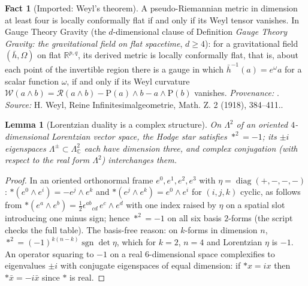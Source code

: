 \documentclass[11pt]{article}
\newtheorem{lemma}[theorem]{Lemma}
\theoremstyle{definition}
\newtheorem{fact}[theorem]{Fact}
\theoremstyle{plain}
\newcommand{\changedmark}[2]{\marginpar{\raggedright\scriptsize\color{#1}#2}}
\providecommand{\C}{}\renewcommand{\C}{\mathbb{C}}
\providecommand{\R}{}\renewcommand{\R}{\mathbb{R}}
\providecommand{\Sch}{}\renewcommand{\Sch}{\mathrm{P}}
\providecommand{\hb}{}\renewcommand{\hb}{\bar{h}}
\begin{document}
\begin{fact}[Imported: Weyl's theorem]\label{c:correspondence.imported-weyls-theorem}
\changedmark{gray}{reworded}
A pseudo-Riemannian metric in dimension at least four is locally conformally flat if and only if its Weyl tensor vanishes. In Gauge Theory Gravity (the $d$-dimensional clause of Definition \emph{Gauge Theory Gravity: the gravitational field on flat spacetime}, $d \geq 4$): for a gravitational field $(\hb, \Omega)$ on flat $\R^{p,q}$, its derived metric is locally conformally flat, that is, about each point of the invertible region there is a gauge in which $\hb^{-1}(a) = e^{\omega}a$ for a scalar function $\omega$, if and only if its Weyl curvature $\mathcal{W}(a \wedge b) = \mathcal{R}(a \wedge b) - \Sch(a) \wedge b - a \wedge \Sch(b)$ vanishes. \emph{Provenance:} \cite{Weyl1918}.
\emph{Source:} H. Weyl, Reine Infinitesimalgeometrie, Math. Z. 2 (1918), 384--411..
\end{fact}

\begin{lemma}[Lorentzian duality is a complex structure]\label{c:correspondence.lorentzian-duality-complex-structure}
On $\Lambda^2$ of an oriented $4$-dimensional Lorentzian vector space, the Hodge star satisfies $\ast^2 = -1$; its $\pm i$ eigenspaces $\Lambda^\pm \subset \Lambda^2_\C$ each have dimension three, and complex conjugation (with respect to the real form $\Lambda^2$) interchanges them.
\end{lemma}
\begin{proof}
In an oriented orthonormal frame $e^0, e^1, e^2, e^3$ with $\eta = \operatorname{diag}(+,-,-,-)$: $\ast(e^0\wedge e^i) = -e^j\wedge e^k$ and $\ast(e^j\wedge e^k) = e^0\wedge e^i$ for $(i,j,k)$ cyclic, as follows from $\ast(e^a\wedge e^b) = \tfrac12\epsilon^{ab}{}_{cd}\,e^c\wedge e^d$ with one index raised by $\eta$ on a spatial slot introducing one minus sign; hence $\ast^2 = -1$ on all six basis $2$-forms (the script checks the full table). The basis-free reason: on $k$-forms in dimension $n$, $\ast^2 = (-1)^{k(n-k)}\operatorname{sgn}\det\eta$, which for $k = 2$, $n = 4$ and Lorentzian $\eta$ is $-1$. An operator squaring to $-1$ on a real $6$-dimensional space complexifies to eigenvalues $\pm i$ with conjugate eigenspaces of equal dimension: if $\ast x = ix$ then $\ast \bar x = -i\bar x$ since $\ast$ is real.

\end{proof}
\end{document}
